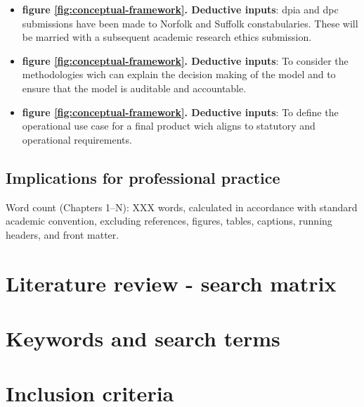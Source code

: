 \documentclass[12pt,a4paper,oneside]{report}
\begin{document}
\begin{itemize}
    \begin{itemize}
        \item \textbf{figure \ref{fig:conceptual-framework}. Deductive inputs}: \gls{dpia} and \gls{dpc} submissions have been made to Norfolk and Suffolk constabularies.  These will be married with a subsequent academic research ethics submission.
        \item \textbf{figure \ref{fig:conceptual-framework}. Deductive inputs}: To consider the methodologies wich can explain the decision making of the model and to ensure that the model is auditable and accountable.
        \item \textbf{figure \ref{fig:conceptual-framework}. Deductive inputs}: To define the operational use case for a final product wich aligns to statutory and operational requirements.
    \end{itemize}
\end{itemize}

\section{Implications for professional practice}
\label{sec:implications-for-professional-practice}

\clearpage

Word count (Chapters 1–N): XXX words, calculated in accordance with standard academic convention, excluding references, figures, tables, captions, running headers, and front matter.

\appendix

\chapter{Literature review - search matrix}
\label{app:literature-review-search-matrix}


\chapter{Keywords and search terms}
\label{app:keywords-and-search-terms}


\chapter{Inclusion criteria}
\label{app:inclusion-criteria}

\end{document}

